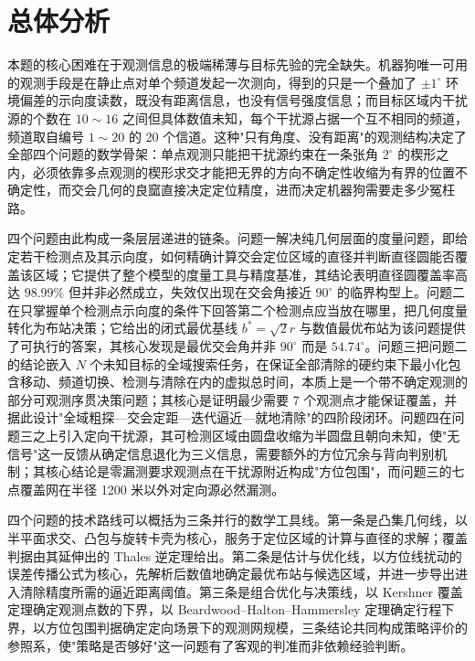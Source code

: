 
\section{总体分析}

本题的核心困难在于观测信息的极端稀薄与目标先验的完全缺失。机器狗唯一可用的观测手段是在静止点对单个频道发起一次测向，得到的只是一个叠加了 $\pm1^\circ$ 环境偏差的示向度读数，既没有距离信息，也没有信号强度信息；而目标区域内干扰源的个数在 $10\sim16$ 之间但具体数值未知，每个干扰源占据一个互不相同的频道，频道取自编号 $1\sim20$ 的 20 个信道。这种"只有角度、没有距离"的观测结构决定了全部四个问题的数学骨架：单点观测只能把干扰源约束在一条张角 $2^\circ$ 的楔形之内，必须依靠多点观测的楔形求交才能把无界的方向不确定性收缩为有界的位置不确定性，而交会几何的良窳直接决定定位精度，进而决定机器狗需要走多少冤枉路。

四个问题由此构成一条层层递进的链条。问题一解决纯几何层面的度量问题，即给定若干检测点及其示向度，如何精确计算交会定位区域的直径并判断直径圆能否覆盖该区域；它提供了整个模型的度量工具与精度基准，其结论表明直径圆覆盖率高达 $98.99\%$ 但并非必然成立，失效仅出现在交会角接近 $90^\circ$ 的临界构型上。问题二在只掌握单个检测点示向度的条件下回答第二个检测点应当放在哪里，把几何度量转化为布站决策；它给出的闭式最优基线 $b^{*}=\sqrt2r$ 与数值最优布站为该问题提供了可执行的答案，其核心发现是最优交会角并非 $90^\circ$ 而是 $54.74^\circ$。问题三把问题二的结论嵌入 $N$ 个未知目标的全域搜索任务，在保证全部清除的硬约束下最小化包含移动、频道切换、检测与清除在内的虚拟总时间，本质上是一个带不确定观测的部分可观测序贯决策问题；其核心是证明最少需要 7 个观测点才能保证覆盖，并据此设计"全域粗探—交会定距—迭代逼近—就地清除"的四阶段闭环。问题四在问题三之上引入定向干扰源，其可检测区域由圆盘收缩为半圆盘且朝向未知，使"无信号"这一反馈从确定信息退化为三义信息，需要额外的方位冗余与背向判别机制；其核心结论是零漏测要求观测点在干扰源附近构成"方位包围"，而问题三的七点覆盖网在半径 1200 米以外对定向源必然漏测。

四个问题的技术路线可以概括为三条并行的数学工具线。第一条是凸集几何线，以半平面求交、凸包与旋转卡壳为核心，服务于定位区域的计算与直径的求解；覆盖判据由其延伸出的 Thales 逆定理给出。第二条是估计与优化线，以方位线扰动的误差传播公式为核心，先解析后数值地确定最优布站与候选区域，并进一步导出进入清除精度所需的逼近距离阈值。第三条是组合优化与决策线，以 Kershner 覆盖定理确定观测点数的下界，以 Beardwood--Halton--Hammersley 定理确定行程下界，以方位包围判据确定定向场景下的观测网规模，三条结论共同构成策略评价的参照系，使"策略是否够好"这一问题有了客观的判准而非依赖经验判断。
